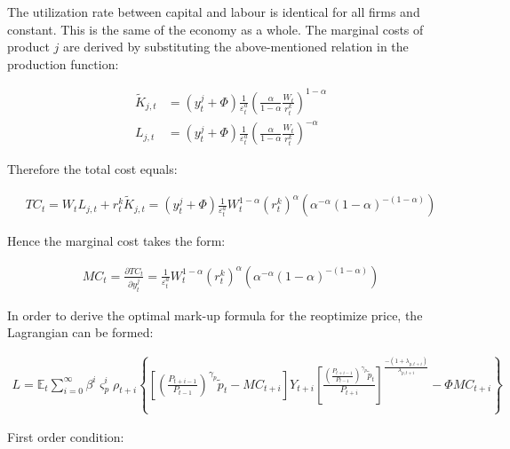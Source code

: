 \documentclass{pracamgr}
\numberwithin{equation}{section}
\begin{document}
The utilization rate between capital and labour is identical for all firms and constant. This is the same of the economy as a whole. The marginal costs of product $j$ are derived by substituting the above-mentioned relation in the production function:

\begin{align}
\widetilde{K}_{j,t} &= \left(y_{t}^{j} + \Phi \right) \frac{1}{\varepsilon_{t}^{a}} \left(\frac{\alpha}{1-\alpha} \frac{W_{t}}{r_{t}^{k}} \right)^{1-\alpha} \\
L_{j,t} &= \left(y_{t}^{j} + \Phi \right) \frac{1}{\varepsilon_{t}^{a}} \left(\frac{\alpha}{1-\alpha} \frac{W_{t}}{r_{t}^{k}} \right)^{-\alpha}
\end{align}

Therefore the total cost equals:

\begin{align}
TC_{t} = W_{t}L_{j,t}  + r_{t}^{k} \widetilde{K}_{j,t} =  \left(y_{t}^{j} + \Phi \right) \frac{1}{\varepsilon_{t}^{a}} W_{t}^{1-\alpha} \left(r_{t}^{k} \right)^{\alpha} \left( \alpha^{-\alpha} (1-\alpha)^{-(1-\alpha)}\right)
\end{align}

Hence the marginal cost takes the form:

\begin{align}
MC_{t} = \frac{\partial TC_{t}}{\partial y_{t}^{j}} = \frac{1}{\varepsilon_{t}^{a}} W_{t}^{1-\alpha} \left(r_{t}^{k} \right)^{\alpha} \left( \alpha^{-\alpha} (1-\alpha)^{-(1-\alpha)}\right)
\end{align}

In order to derive the optimal mark-up formula for the reoptimize price, the Lagrangian can be formed:

\begin{align}
L = \mathbb{E}_{t}  \sum\limits_{i=0}^{\infty} \beta^{i} \varsigma_{p}^{i} \rho_{t+i} \left\{ \left[
\left(\frac{P_{t+i-1}}{P_{t-1}} \right)^{\gamma_{p}}\widetilde{p}_{t} - MC_{t+i}
\right] Y_{t+i} \left[ \frac{\left(\frac{P_{t+i-1}}{P_{t-1}} \right)^{\gamma_{p}}\widetilde{p}_{t}}{P_{t+i}} \right]^{\frac{-(1+\lambda_{p,t+i})}{\lambda_{p,t+i}}} - \Phi MC_{t+i} \right\}
\end{align}

First order condition:
\end{document}
